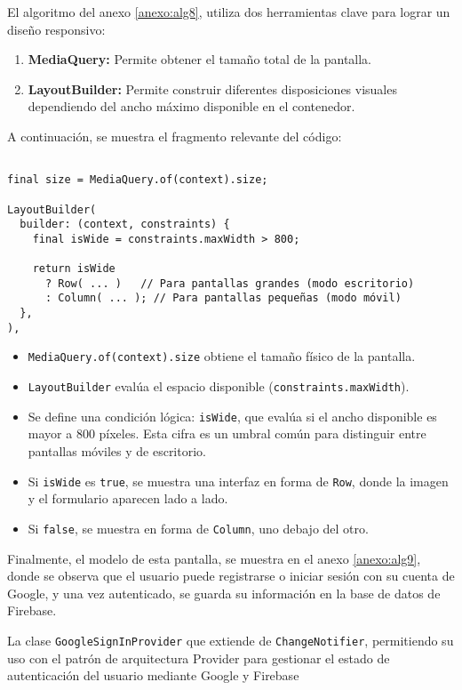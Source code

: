 El algoritmo del anexo \ref{anexo:alg8}, utiliza dos herramientas clave para lograr un diseño responsivo:

\begin{enumerate}
    \item \textbf{MediaQuery:} Permite obtener el tamaño total de la pantalla.
    \item \textbf{LayoutBuilder:} Permite construir diferentes disposiciones visuales dependiendo del ancho máximo disponible en el contenedor.
\end{enumerate}

A continuación, se muestra el fragmento relevante del código:

\begin{verbatim}

final size = MediaQuery.of(context).size;

LayoutBuilder(
  builder: (context, constraints) {
    final isWide = constraints.maxWidth > 800;

    return isWide
      ? Row( ... )   // Para pantallas grandes (modo escritorio)
      : Column( ... ); // Para pantallas pequeñas (modo móvil)
  },
),
\end{verbatim}



\begin{itemize}
    \item \texttt{MediaQuery.of(context).size} obtiene el tamaño físico de la pantalla.
    \item \texttt{LayoutBuilder} evalúa el espacio disponible (\texttt{constraints.maxWidth}).
    \item Se define una condición lógica: \texttt{isWide}, que evalúa si el ancho disponible es mayor a 800 píxeles. Esta cifra es un umbral común para distinguir entre pantallas móviles y de escritorio.
    \item Si \texttt{isWide} es \texttt{true}, se muestra una interfaz en forma de \texttt{Row}, donde la imagen y el formulario aparecen lado a lado.
    \item Si \texttt{false}, se muestra en forma de \texttt{Column}, uno debajo del otro.
\end{itemize}


Finalmente, el modelo de esta pantalla, se muestra en el anexo \ref{anexo:alg9}, donde se observa que el usuario puede registrarse o iniciar sesión con su cuenta de Google, y una vez autenticado, se guarda su información en la base de datos de Firebase.


La clase \texttt{GoogleSignInProvider} que extiende de \texttt{ChangeNotifier}, permitiendo su uso con el patrón de arquitectura Provider para gestionar el estado de autenticación del usuario mediante Google y Firebase

